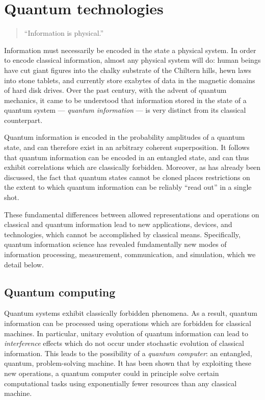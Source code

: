 \section{Quantum technologies} 
\label{sec:quantum-technologies}
\begin{quote}
``Information is physical.''
\end{quote}
Information must necessarily be encoded in the state a physical system.
In order to encode classical information, almost any physical system will do: human beings have cut giant figures into the chalky substrate of the Chiltern hills, hewn laws into stone tablets, and currently store exabytes of data in the magnetic domains of hard disk drives. Over the past century, with the advent of quantum mechanics, it came to be understood that information stored in the state of a quantum system --- \emph{quantum information} --- is very distinct from its classical counterpart. 

Quantum information is encoded in the probability amplitudes of a quantum state, and can therefore exist in an arbitrary coherent superposition. It follows that quantum information can be encoded in an entangled state, and can thus exhibit correlations which are classically forbidden.  Moreover, as has already been discussed, the fact that quantum states cannot be cloned places restrictions on the extent to which quantum information can be reliably ``read out'' in a single shot. 

These fundamental differences between allowed representations and operations on classical and quantum information lead to new applications, devices, and technologies, which cannot be accomplished by classical means. Specifically, quantum information science has revealed fundamentally new modes of information processing, measurement, communication, and simulation, which we detail below.

\subsection{Quantum computing} 
\label{sec:quantum-computing}
Quantum systems exhibit classically forbidden phenomena. As a result, quantum information can be processed using operations which are forbidden for classical machines.
In particular, unitary evolution of quantum information can lead to \emph{interference} effects which do not occur under stochastic evolution of classical information. 
This leads to the possibility of a \emph{quantum computer}: an entangled, quantum, problem-solving machine.
It has been shown that by exploiting these new operations, a quantum computer could in principle solve certain computational tasks using exponentially fewer resources than any classical machine. 

